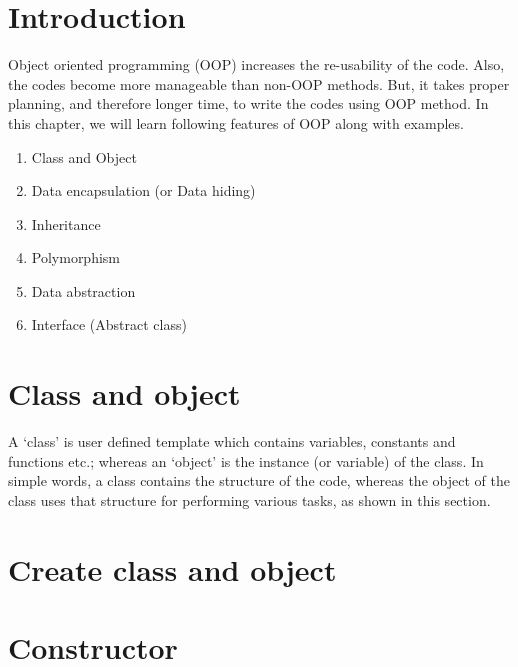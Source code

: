 \section{Introduction}

Object oriented programming (OOP) increases the re-usability of the code. Also, the codes
become more manageable than non-OOP methods. But, it takes proper planning, and therefore
longer time, to write the codes using OOP method. In this chapter, we will learn following features of OOP along with examples.

\begin{enumerate}
	\item Class and Object
	\item Data encapsulation (or Data hiding)
	\item Inheritance
	\item Polymorphism
	\item Data abstraction
	\item Interface (Abstract class)


\end{enumerate}

\section{Class and object}
A `class' is user defined template which contains variables, constants and functions etc.; whereas an `object' is the instance (or variable) of the class. In simple words, a class contains the structure of the code, whereas the object of the class uses that structure for performing various tasks, as shown in this section.

\section{Create class and object}







\section{Constructor}

